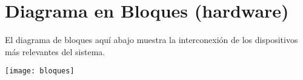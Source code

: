\section{Diagrama en Bloques (hardware)}
El diagrama de bloques aquí abajo muestra la interconexión de los dispositivos más relevantes del sistema.
\begin{center}
    \texttt{[image: bloques]}
\end{center}



